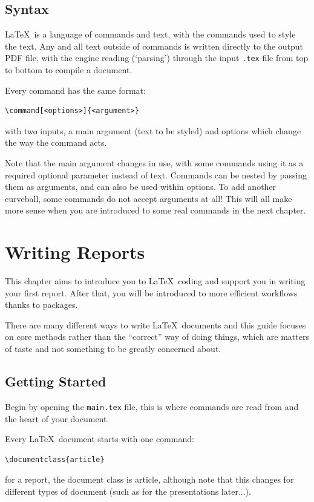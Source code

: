 \documentclass{book}
\begin{document}
\section{Syntax}
\LaTeX\ is a language of commands and text, with the commands used to style the text. Any and all text outside of commands is written directly to the output PDF file, with the engine reading (`parsing') through the input \verb|.tex| file from top to bottom to compile a document.

Every command has the same format:
\begin{verbatim}
\command[<options>]{<argument>}
\end{verbatim}
with two inputs, a main argument (text to be styled) and options which change the way the command acts.

Note that the main argument changes in use, with some commands using it as a required optional parameter instead of text. Commands can be nested by passing them as arguments, and can also be used within options. To add another curveball, some commands do not accept arguments at all! This will all make more sense when you are introduced to some real commands in the next chapter.

\chapter{Writing Reports}
This chapter aims to introduce you to \LaTeX\ coding and support you in writing your first report. After that, you will be introduced to more efficient workflows thanks to packages.

There are many different ways to write \LaTeX\ documents and this guide focuses on core methods rather than the ``correct'' way of doing things, which are matters of taste and not something to be greatly concerned about.

\section{Getting Started}
Begin by opening the \verb|main.tex| file, this is where commands are read from and the heart of your document.

Every \LaTeX\ document starts with one command:
\begin{verbatim}
\documentclass{article}
\end{verbatim}
for a report, the document class is \textsf{article}, although note that this changes for different types of document (such as for the presentations later...).
\end{document}
